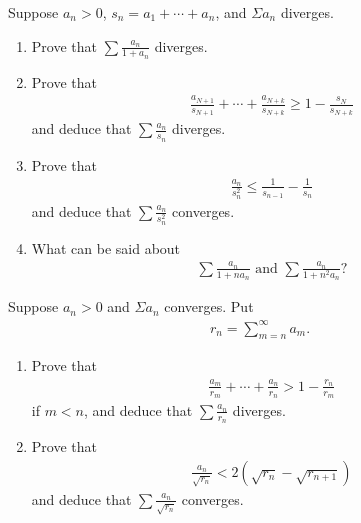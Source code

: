   \begin{exercise}[Rudin 3.11]
    Suppose $a_n > 0$, $s_n = a_1 + \cdots + a_n$, and $\Sigma a_n$ diverges.
    \begin{enumerate} 
      \item[(a)] Prove that $\sum \frac{a_n}{1+a_n}$ diverges.
      \item[(b)] Prove that
      \begin{align*}
        \frac{a_{N+1}}{s_{N+1}} + \cdots + \frac{a_{N+k}}{s_{N+k}} \geq 1 - \frac{s_N}{s_{N+k}}
      \end{align*}
      and deduce that $\sum \frac{a_n}{s_n}$ diverges.
      \item[(c)] Prove that
      \begin{align*}
        \frac{a_n}{s_n^2} \leq \frac{1}{s_{n-1}} - \frac{1}{s_n}
      \end{align*}
      and deduce that $\sum \frac{a_n}{s_n^2}$ converges.
      \item[(d)] What can be said about
      \begin{align*}
        \sum \frac{a_n}{1+na_n} \text{ and } \sum \frac{a_n}{1+n^2a_n}?
      \end{align*}
    \end{enumerate}
  \end{exercise}
  \begin{solution}
    
  \end{solution}

  \begin{exercise}[Rudin 3.12]
    Suppose $a_n > 0$ and $\Sigma a_n$ converges. Put
    \begin{align*}
      r_n = \sum_{m=n}^{\infty} a_m.
    \end{align*}
    \begin{enumerate} 
      \item[(a)] Prove that
      \begin{align*}
        \frac{a_m}{r_m} + \cdots + \frac{a_n}{r_n} > 1 - \frac{r_n}{r_m}
      \end{align*}
      if $m < n$, and deduce that $\sum \frac{a_n}{r_n}$ diverges.
      \item[(b)] Prove that
      \begin{align*}
        \frac{a_n}{\sqrt{r_n}} < 2(\sqrt{r_n} - \sqrt{r_{n+1}})
      \end{align*}
      and deduce that $\sum \frac{a_n}{\sqrt{r_n}}$ converges.
    \end{enumerate}
  \end{exercise}
  \begin{solution}
    
  \end{solution}

